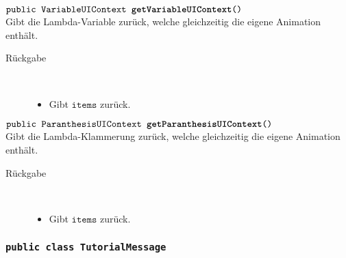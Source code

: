 \begin{description}
		\item $\texttt{public VariableUIContext \textbf{getVariableUIContext}()}$ \\ Gibt die Lambda-Variable zurück, welche gleichzeitig die eigene Animation enthält.
		\begin{description}
			\item[Rückgabe] \hfill \\
			\vspace{-.8cm}
			\begin{itemize}
				\item Gibt $\texttt{items}$ zurück.
			\end{itemize}
			\end{description}
			
		\item $\texttt{public ParanthesisUIContext \textbf{getParanthesisUIContext}()}$ \\ Gibt die Lambda-Klammerung zurück, welche gleichzeitig die eigene Animation enthält.
		\begin{description}
			\item[Rückgabe] \hfill \\
			\vspace{-.8cm}
			\begin{itemize}
				\item Gibt $\texttt{items}$ zurück.
			\end{itemize}
			\end{description}

		
	\end{description}


\subsubsection{\normalfont \texttt{public class \textbf{TutorialMessage}}}

